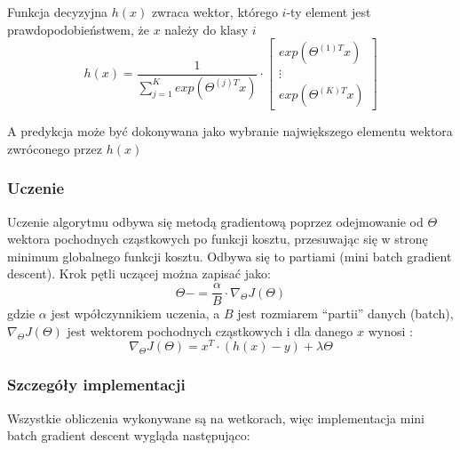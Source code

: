 \documentclass[11pt]{article}
\begin{document}
Funkcja decyzyjna \(h(x)\) zwraca wektor, którego \(i\)-ty element jest
prawdopodobieństwem, że \(x\) należy do klasy \(i\)
\[ h(x) = \frac{1}{\sum^K_{j=1}exp(\Theta^{(j)T}x)} \cdot \begin{bmatrix} exp(\Theta^{(1)T}x)  \\  \vdots \\  exp(\Theta^{(K)T}x) \end{bmatrix} \]

A predykcja może być dokonywana jako wybranie największego elementu
wektora zwróconego przez \(h(x)\)

\hypertarget{uczenie}{%
\subsubsection{Uczenie}\label{uczenie}}

Uczenie algorytmu odbywa się metodą gradientową poprzez odejmowanie od
\(\Theta\) wektora pochodnych cząstkowych po funkcji kosztu, przesuwając
się w stronę minimum globalnego funkcji kosztu. Odbywa się to partiami
(mini batch gradient descent). Krok pętli uczącej można zapisać jako:
\[ \Theta -= \frac{\alpha}{B} \cdot \nabla_{\Theta}J(\Theta) \] gdzie
\(\alpha\) jest wpółczynnikiem uczenia, a \(B\) jest rozmiarem
``partii'' danych (batch), \(\nabla_{\Theta}J(\Theta)\) jest wektorem
pochodnych cząstkowych i dla danego \(x\) wynosi :
\[ \nabla_{\Theta}J(\Theta) = x^T \cdot (h(x) - y) + \lambda \Theta \]
\clearpage
\hypertarget{szczeguxf3ux142y-implementacji}{%
\subsubsection{Szczegóły
implementacji}\label{szczeguxf3ux142y-implementacji}}

Wszystkie obliczenia wykonywane są na wetkorach, więc implementacja mini
batch gradient descent wygląda następująco:
\end{document}
